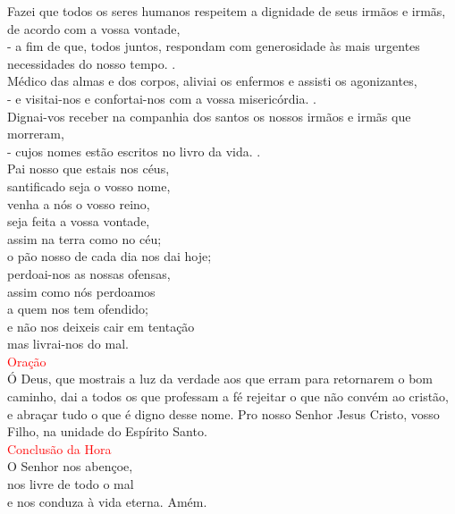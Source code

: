 \documentclass{book}
\begin{document}
\begin{center}
    Fazei que todos os seres humanos respeitem a dignidade de seus irmãos e irmãs, de acordo com a vossa vontade, \\
    - a fim de que, todos juntos, respondam com generosidade às mais urgentes necessidades do nosso tempo. {\color{red} \Rbar.}
    \vspace{.2cm} \\
    Médico das almas e dos corpos, aliviai os enfermos e assisti os agonizantes, \\
    - e visitai-nos e confortai-nos com a vossa misericórdia. {\color{red} \Rbar.}
    \vspace{.2cm} \\
    Dignai-vos receber na companhia dos santos os nossos irmãos e irmãs que morreram, \\
    - cujos nomes estão escritos no livro da vida. {\color{red} \Rbar.}
    \vspace{.2cm} \\
    Pai nosso que estais nos céus, \\
    santificado seja o vosso nome, \\
    venha a nós o vosso reino, \\
    seja feita a vossa vontade, \\
    assim na terra como no céu; \\
    o pão nosso de cada dia nos dai hoje; \\
    perdoai-nos as nossas ofensas, \\
    assim como nós perdoamos \\
    a quem nos tem ofendido; \\
    e não nos deixeis cair em tentação \\
    mas livrai-nos do mal.
    \vspace{.2cm} \\
    \textcolor{red}{Oração}
    \vspace{.2cm} \\
    Ó Deus, que mostrais a luz da verdade aos que erram para retornarem o bom caminho, dai a todos os que professam a fé rejeitar o que não convém ao cristão, e abraçar tudo o que é digno desse nome. Pro nosso Senhor Jesus Cristo, vosso Filho, na unidade do Espírito Santo.
    \vspace{.2cm} \\
    \textcolor{red}{Conclusão da Hora}
    \vspace{.2cm} \\
    O Senhor nos abençoe, \\
    nos livre de todo o mal \\
    e nos conduza à vida eterna. Amém.
\end{center}
\end{document}
